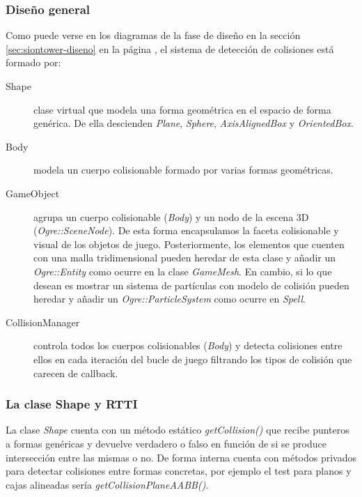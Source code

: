 \subsubsection{Diseño general}

Como puede verse en los diagramas de la fase de diseño en la sección
\ref{sec:siontower-diseno} en la página \pageref{sec:siontower-diseno},
el sistema de detección de colisiones está formado por:\\

\begin{description}
    \item [Shape] clase virtual que modela una forma geométrica en el espacio
    de forma genérica. De ella descienden \textit{Plane}, \textit{Sphere}, \textit{AxisAlignedBox} y
    \textit{OrientedBox}.
    \item [Body] modela un cuerpo colisionable formado por varias formas geométricas.
    \item [GameObject] agrupa un cuerpo colisionable (\textit{Body}) y un
    nodo de la escena 3D (\textit{Ogre::SceneNode}). De esta forma encapsulamos
    la faceta colisionable y visual de los objetos de juego. Posteriormente,
    los elementos que cuenten con una malla tridimensional pueden heredar
    de esta clase y añadir un \textit{Ogre::Entity} como ocurre
    en la clase \textit{GameMesh}. En cambio, si lo que desean es mostrar un
    sistema de partículas con modelo de colisión pueden heredar y añadir
    un \textit{Ogre::ParticleSystem} como ocurre en \textit{Spell}.
    \item [CollisionManager] controla todos los cuerpos colisionables
    (\textit{Body}) y detecta colisiones entre ellos en cada iteración del
    bucle de juego filtrando los tipos de colisión que carecen de callback. 
\end{description}

\subsubsection{La clase Shape y RTTI}

La clase \textit{Shape} cuenta con un método estático \textit{getCollision()}
que recibe punteros a formas genéricas y devuelve verdadero o falso
en función de si se produce intersección entre las mismas o no. De forma
interna cuenta con métodos privados para detectar colisiones entre formas
concretas, por ejemplo el test para planos y cajas alineadas sería
\textit{getCollisionPlaneAABB()}.\\

